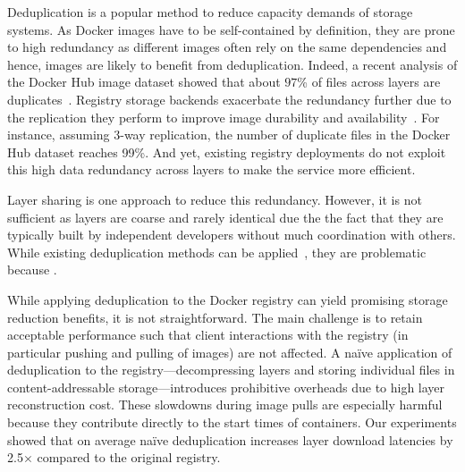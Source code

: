 Deduplication is a popular method to reduce capacity demands of storage systems.
%
As Docker images have to be self-contained by definition, they are prone to high
redundancy as different images often rely on the same dependencies and hence,
images are likely to benefit from deduplication.
%
Indeed, a recent analysis of the
Docker Hub image dataset showed that about $97$\% of files across layers are
duplicates~\cite{dedupanalysis}.
%
%
Registry storage backends exacerbate the redundancy further due to the
replication they perform to improve image durability and
availability~\cite{Bonvin:2010:SFS:1807128.1807162}.
%
For instance, assuming 3-way replication, the number of duplicate files in the
Docker Hub dataset reaches 99\%.
%
And yet, existing registry deployments do not exploit this high data redundancy
across layers to make the service more efficient.

Layer sharing is one approach to reduce this redundancy.
%
However, it is not sufficient as layers are coarse and rarely identical due the the
fact that they are typically built by independent developers without much coordination
with others.
%
While existing deduplication methods can be applied~\cite{dedup1,dedup2,dedup3}, they
are problematic because .



While applying deduplication to the Docker registry can yield promising storage
reduction benefits, it is not straightforward.
%
The main challenge is to retain acceptable performance such that client
interactions with the registry (in particular pushing and pulling of images)
are not affected.
%
A na\"{i}ve application of deduplication to the registry---decompressing
layers and storing individual files in content-addressable storage---introduces
prohibitive overheads due to high layer reconstruction cost.
%
These slowdowns during image pulls are especially
harmful because they contribute directly to the start times of containers.
%
Our experiments showed that on average na\"{i}ve deduplication increases layer
download latencies by 2.5$\times$ compared to the original registry.

